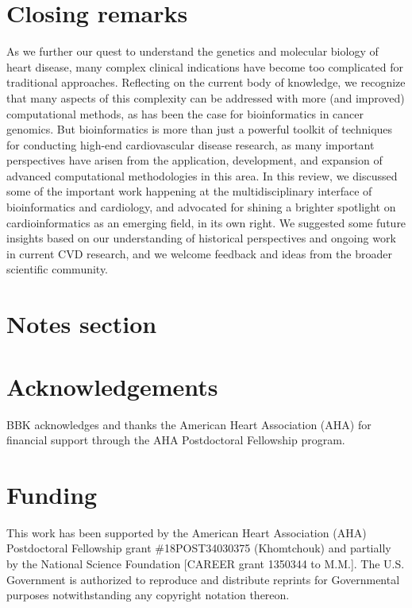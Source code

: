 \documentclass[letter]{bioinfo}
\begin{document}
	\section*{Closing remarks}
	As we further our quest to understand the genetics and molecular biology of heart disease, many complex clinical indications have become too complicated for traditional approaches. Reflecting on the current body of knowledge, we recognize that many aspects of this complexity can be addressed with more (and improved) computational methods, as has been the case for bioinformatics in cancer genomics.  But bioinformatics is more than just a powerful toolkit of techniques for conducting high-end cardiovascular disease research, as many important perspectives have arisen from the application, development, and expansion of advanced computational methodologies in this area.  In this review, we discussed some of the important work happening at the multidisciplinary interface of bioinformatics and cardiology, and advocated for shining a brighter spotlight on cardioinformatics as an emerging field, in its own right.  We suggested some future insights based on our understanding of historical perspectives and ongoing work in current CVD research, and we welcome feedback and ideas from the broader scientific community.

	
	\section*{Notes section}
	
	
	\enlargethispage{12pt}
	
	
	
	
	\section*{Acknowledgements}
	
	BBK acknowledges and thanks the American Heart Association (AHA) for financial support through the AHA Postdoctoral Fellowship program.
	\vspace*{-12pt}
	
	\section*{Funding}
	
	This work has been supported by the American Heart Association (AHA) Postdoctoral Fellowship grant \#18POST34030375 (Khomtchouk) and partially by the National Science Foundation [CAREER grant 1350344 to M.M.]. The U.S. Government is authorized to reproduce and distribute reprints for Governmental purposes notwithstanding any copyright notation thereon.\vspace*{-12pt}
	
\end{document}

